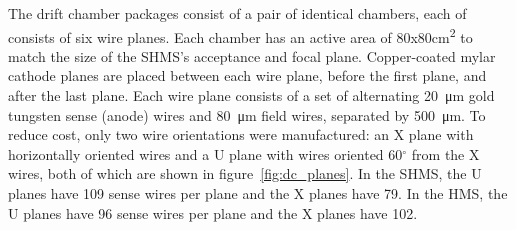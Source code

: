 The drift chamber packages consist of a pair of identical chambers, each of
consists of six wire planes.
Each chamber has an active area of 80x80\si{\cm\squared} to match the size of
the SHMS's acceptance and focal plane.
Copper-coated mylar cathode planes are placed between each wire plane, before
the first plane, and after the last plane.
Each wire plane consists of a set of alternating \SI{20}{\micro\meter} gold
tungsten sense (anode) wires and \SI{80}{\micro\meter} field wires, separated
by \SI{500}{\micro\meter}.
To reduce cost, only two wire orientations were manufactured: an X plane with
horizontally oriented wires and a U plane with wires oriented 60$^{\circ}$ from
the X wires, both of which are shown in figure~\ref{fig:dc_planes}.
In the SHMS, the U planes have 109 sense wires per plane and the X planes have
79.
In the HMS, the U planes have 96 sense wires per plane and the X planes have
102.

